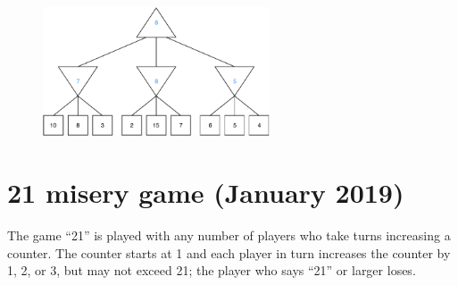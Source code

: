 \documentclass[11pt, a4paper]{article}
\begin{document}
\begin{enumerate}
    \begin{solution}
        \begin{figure}[H]
            \centering
            \includegraphics[width=0.6\textwidth]{figures/e2_minimax_3.pdf}
        \end{figure}
    \end{solution}
\end{enumerate}

\newpage

\section{21 misery game (January 2019)}

The game \enquote{21} is played with any number of players who take turns increasing a counter. The counter starts at 1 and each player in turn increases the counter by 1, 2, or 3, but may not exceed 21; the player who says \enquote{21} or larger loses.
\end{document}
